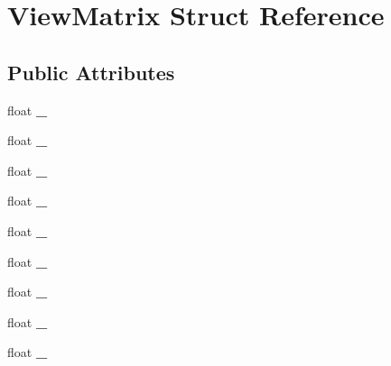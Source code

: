 \hypertarget{struct_view_matrix}{\section{View\-Matrix Struct Reference}
\label{struct_view_matrix}
}
\subsection*{Public Attributes}
\begin{DoxyCompactItemize}
\item 
\hypertarget{struct_view_matrix_adbd52b0f86ed33790f5876099baa9766}{float {\bfseries \-\_}}\label{struct_view_matrix_adbd52b0f86ed33790f5876099baa9766}

\item 
\hypertarget{struct_view_matrix_a244f4067427c2b721119fd1327e80210}{float {\bfseries \-\_}}\label{struct_view_matrix_a244f4067427c2b721119fd1327e80210}

\item 
\hypertarget{struct_view_matrix_a205e3215c4fd1a30c1cbaa10c90346c7}{float {\bfseries \-\_}}\label{struct_view_matrix_a205e3215c4fd1a30c1cbaa10c90346c7}

\item 
\hypertarget{struct_view_matrix_a2dbb46726561b0af2736450c09863647}{float {\bfseries \-\_}}\label{struct_view_matrix_a2dbb46726561b0af2736450c09863647}

\item 
\hypertarget{struct_view_matrix_a4c8de8514d9085259fd12b925a6766df}{float {\bfseries \-\_}}\label{struct_view_matrix_a4c8de8514d9085259fd12b925a6766df}

\item 
\hypertarget{struct_view_matrix_acc513c3d7c1706af1ec5470b2eb264cd}{float {\bfseries \-\_}}\label{struct_view_matrix_acc513c3d7c1706af1ec5470b2eb264cd}

\item 
\hypertarget{struct_view_matrix_a910c4911591dd888f4a046079a2ce4d1}{float {\bfseries \-\_}}\label{struct_view_matrix_a910c4911591dd888f4a046079a2ce4d1}

\item 
\hypertarget{struct_view_matrix_aec3be88d4eebe803bdc8e4bd7c52a15b}{float {\bfseries \-\_}}\label{struct_view_matrix_aec3be88d4eebe803bdc8e4bd7c52a15b}

\item 
\hypertarget{struct_view_matrix_a9ae1b7ed8bdf68daef31d178acfcde70}{float {\bfseries \-\_}}\label{struct_view_matrix_a9ae1b7ed8bdf68daef31d178acfcde70}


\end{DoxyCompactItemize}
